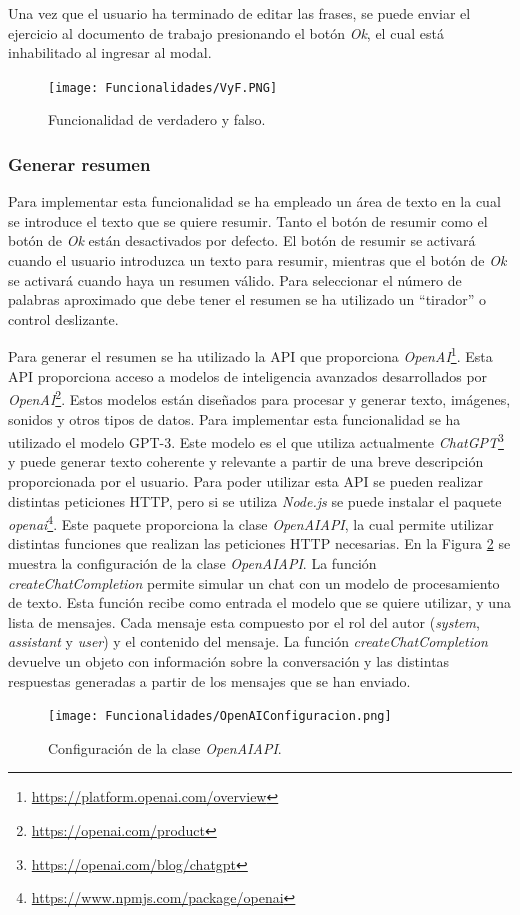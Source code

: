 Una vez que el usuario ha terminado de editar las frases, se puede enviar el ejercicio al documento de trabajo presionando el botón \textit{Ok}, el cual está inhabilitado al ingresar al modal.

\begin{figure}[ht!]
  \centering
  \texttt{[image: Funcionalidades/VyF.PNG]}
  \caption{Funcionalidad de verdadero y falso.}
  \label{fig:vyf}
\end{figure}

\subsubsection{Generar resumen}
\label{sec:impresumen}
Para implementar esta funcionalidad se ha empleado un área de texto en la cual se introduce el texto que se quiere resumir. Tanto el botón de resumir como el botón de \textit{Ok} están desactivados por defecto. El botón de resumir se activará cuando el usuario introduzca un texto para resumir, mientras que el botón de \textit{Ok} se activará cuando haya un resumen válido. Para seleccionar el número de palabras aproximado que debe tener el resumen se ha utilizado un ``tirador'' o control deslizante.

Para generar el resumen se ha utilizado la API que proporciona \textit{OpenAI}\footnote{\url{https://platform.openai.com/overview}}. Esta API proporciona acceso a modelos de inteligencia avanzados desarrollados por \textit{OpenAI}\footnote{\url{https://openai.com/product}}. Estos modelos están diseñados para procesar y generar texto, imágenes, sonidos y otros tipos de datos. Para implementar esta funcionalidad se ha utilizado el modelo GPT-3. Este modelo es el que utiliza actualmente \textit{ChatGPT}\footnote{\url{https://openai.com/blog/chatgpt}} y puede generar texto coherente y relevante a partir de una breve descripción proporcionada por el usuario. Para poder utilizar esta API se pueden realizar distintas peticiones HTTP, pero si se utiliza \textit{Node.js} se puede instalar el paquete \textit{openai}\footnote{\url{https://www.npmjs.com/package/openai}}. Este paquete proporciona la clase \textit{OpenAIAPI}, la cual permite utilizar distintas funciones que realizan las peticiones HTTP necesarias. En la Figura \ref{fig:impresumenconfiguracion} se muestra la configuración de la clase \textit{OpenAIAPI}. La función \textit{createChatCompletion} permite simular un chat con un modelo de procesamiento de texto. Esta función recibe como entrada el modelo que se quiere utilizar, y una lista de mensajes. Cada mensaje esta compuesto por el rol del autor (\textit{system}, \textit{assistant} y \textit{user}) y el contenido del mensaje. La función \textit{createChatCompletion} devuelve un objeto con información sobre la conversación y las distintas respuestas generadas a partir de los mensajes que se han enviado.
\begin{figure}[ht!]
  \centering
  \texttt{[image: Funcionalidades/OpenAIConfiguracion.png]}
  \caption{Configuración de la clase \textit{OpenAIAPI}.}
  \label{fig:impresumenconfiguracion}
\end{figure}

